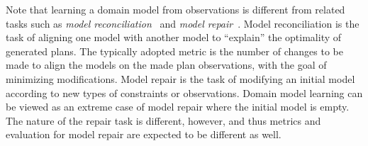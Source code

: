 \documentclass{article}
\theoremstyle{definition}
\theoremstyle{remark}
\newif\ifaddcomments
\newcommand{\roni}[1]{\ifaddcomments{\textcolor{red}{[Roni: #1]}}\fi}
\newcommand{\yarin}[1]{\ifaddcomments{\textcolor{teal}{[Yarin: #1]}}\fi}
\newcommand{\leo}[1]{\ifaddcomments{\textcolor{pink}{[Leonardo: #1]}}\fi}
\begin{document}
Note that learning a domain model from observations is different from related tasks such as \emph{model reconciliation}~\citep[inter alia]{ChakrabortiSZK17,SreedharanHMK19}\yarin{what is inter alia ?} and \emph{model repair}~\citep{bercher2025aSurvey}. 
Model reconciliation is the task of aligning one model with another model to ``explain'' the optimality of generated plans. 
The typically adopted metric is 
the number of changes to be made to align the models on the made plan observations, with the goal of minimizing modifications.
Model repair is the task of modifying an initial model according to new types of constraints or observations. Domain model learning can be viewed as an extreme case of model repair where the initial model is empty\yarin{, but, the objectives differ. Therefore, assessing model repair requires evaluation measures specifically designed to capture its unique objectives and constraints.}. The nature of the repair task is different, however, and thus metrics and evaluation for model repair are expected to be different as well. 
\roni{I'm not super happy with my last 2 sentences.}  
\leo{maybe we could mention model le}






\end{document}
